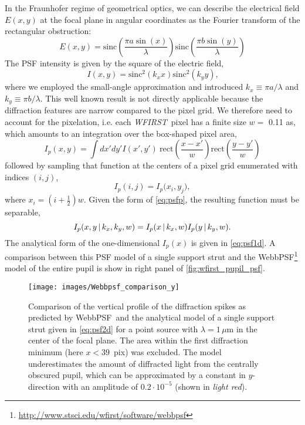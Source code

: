 \documentclass[modern, times]{aastex61}
\newcommand\wfirst{\textit{WFIRST}}
\newcommand\webbpsf{{\sc WebbPSF}}
\begin{document}
In the Fraunhofer regime of geometrical optics, we can describe the electrical field $E(x,y)$ at the focal plane in angular coordinates as the Fourier transform of the rectangular obstruction:
\begin{equation}
\label{eq:E}
E(x,y) = \text{sinc}\left(\frac{\pi a \sin(x)}{\lambda}\right)\text{sinc}\left(\frac{\pi b \sin(y)}{\lambda}\right)
\end{equation}
The PSF intensity is given by the square of the electric field,
\begin{equation}
\label{eq:psf}
I(x,y) = \text{sinc}^2\left(k_x x\right)\text{sinc}^2\left(k_y y\right)\text{,}
\end{equation}
where we employed the small-angle approximation and introduced $k_x \equiv \pi a\big/\lambda$ and $k_y \equiv \pi b\big/\lambda$. 
This well known result is not directly applicable because the diffraction features are narrow compared to the pixel grid.
We therefore need to account for the pixelation, i.e. each \wfirst\ pixel has a finite size $w=$ 0.11 as, which amounts to an integration over the box-shaped pixel area,
\begin{equation}
\label{eq:psfp}
I_p(x,y) = \int dx'dy' I(x',y')\ \text{rect}\left(\frac{x-x'}{w}\right) \text{rect}\left(\frac{y-y'}{w}\right)
\end{equation}
followed by sampling that function at the centers of a pixel grid enumerated with indices $(i,j)$,
\begin{equation}
\label{eq:sampling}
I_p(i,j) = I_p\big(x_i, y_j),
\end{equation}
where $x_i = (i+\tfrac{1}{2})w$.
Given the form of \autoref{eq:psfp}, the resulting function must be separable,
\begin{equation}
\label{eq:psf2d}
I_p(x,y\,|\,k_x,k_y,w) = I_p(x\,|\,k_x,w) I_p(y\,|\,k_y,w).\\
\end{equation}
The analytical form of the one-dimensional $I_p(x)$ is given in \autoref{eq:psf1d}.
A comparison between this PSF model of a single support strut and the \webbpsf\footnote{\url{http://www.stsci.edu/wfirst/software/webbpsf}} model \citep{Perrin2012,Perrin2014} of the entire pupil  is show in right panel of \autoref{fig:wfirst_pupil_psf}.

\begin{figure}[t]
  \centering\texttt{[image: images/Webbpsf\_comparison\_y]}
  \caption{Comparison of the vertical profile of the diffraction spikes as predicted by \webbpsf\ and the analytical model of a single support strut given in \autoref{eq:psf2d} for a point source with $\lambda=1\,\mu$m in the center of the focal plane. The area within the first diffraction minimum (here $x<39$\, pix) was excluded. The model underestimates the amount of diffracted light from the centrally obscured pupil, which can be approximated by a constant in $y$-direction with an amplitude of $0.2\cdot10^{-5}$ (shown in \emph{light red}).}
\label{fig:psf_y}
\end{figure}
\end{document}
